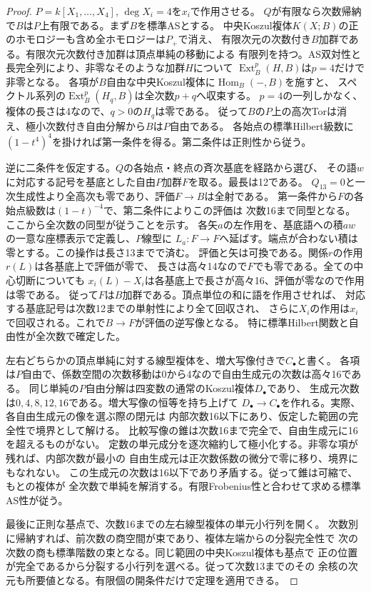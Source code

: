 \begin{proof}
$P=k[X_1,\dots,X_4]$, $\deg X_i=4$を$x_i$で作用させる。
$Q$が有限なら次数帰納で$B$は$P$上有限である。まず$B$を標準ASとする。
中央Koszul複体$K(X;B)$の正のホモロジーも含め全ホモロジーは$P_+$で消え、
有限次元の次数付き$B$加群である。有限次元次数付き加群は頂点単純の移動による
有限列を持つ。AS双対性と長完全列により、非零なそのような加群$H$について
$\operatorname{Ext}_B^p(H,B)$は$p=4$だけで非零となる。
各項が$B$自由な中央Koszul複体に$\operatorname{Hom}_B(-,B)$を施すと、
スペクトル系列の$\operatorname{Ext}^p_B(H_q,B)$は全次数$p+q$へ収束する。
$p=4$の一列しかなく、複体の長さは4なので、$q>0$の$H_q$は零である。
従って$B$の$P$上の高次Torは消え、極小次数付き自由分解から$B$は$P$自由である。
各始点の標準Hilbert級数に$(1-t^4)^4$を掛ければ第一条件を得る。第二条件は正則性から従う。

逆に二条件を仮定する。$Q$の各始点・終点の斉次基底を経路から選び、
その語$w$に対応する記号を基底とした自由$P$加群$F$を取る。最長は12である。
$Q_{13}=0$と一次生成性より全高次も零であり、評価$F\to B$は全射である。
第一条件から$F$の各始点級数は$(1-t)^{-4}$で、第二条件によりこの評価は
次数16まで同型となる。ここから全次数の同型が従うことを示す。
各矢$a$の左作用を、基底語への積$aw$の一意な座標表示で定義し、$P$線型に
$L_a:F\to F$へ延ばす。端点が合わない積は零とする。この操作は長さ13までで済む。
評価と矢は可換である。関係$r$の作用$r(L)$は各基底上で評価が零で、
長さは高々14なので$F$でも零である。全ての中心切断についても
$x_i(L)-X_i$は各基底上で長さが高々16、評価が零なので作用は零である。
従って$F$は$B$加群である。頂点単位の和に語を作用させれば、
対応する基底記号は次数12までの単射性により全て回収され、
さらに$X_i$の作用は$x_i$で回収される。これで$B\to F$が評価の逆写像となる。
特に標準Hilbert関数と自由性が全次数で確定した。

左右どちらかの頂点単純に対する線型複体を、増大写像付きで$C_\bullet$と書く。
各項は$P$自由で、係数空間の次数移動は0から4なので自由生成元の次数は高々16である。
同じ単純の$P$自由分解は四変数の通常のKoszul複体$D_\bullet$であり、
生成元次数は$0,4,8,12,16$である。増大写像の恒等を持ち上げて
$D_\bullet\to C_\bullet$を作れる。実際、各自由生成元の像を選ぶ際の閉元は
内部次数16以下にあり、仮定した範囲の完全性で境界として解ける。
比較写像の錐は次数16まで完全で、自由生成元に16を超えるものがない。
定数の単元成分を逐次縮約して極小化する。非零な項が残れば、内部次数が最小の
自由生成元は正次数係数の微分で零に移り、境界にもなれない。
この生成元の次数は16以下であり矛盾する。従って錐は可縮で、もとの複体が
全次数で単純を解消する。有限Frobenius性と合わせて求める標準AS性が従う。

最後に正則な基点で、次数16までの左右線型複体の単元小行列を開く。
次数別に帰納すれば、前次数の商空間が束であり、複体左端からの分裂完全性で
次の次数の商も標準階数の束となる。同じ範囲の中央Koszul複体も基点で
正の位置が完全であるから分裂する小行列を選べる。従って次数13までのその
余核の次元も所要値となる。有限個の開条件だけで定理を適用できる。
\end{proof}

